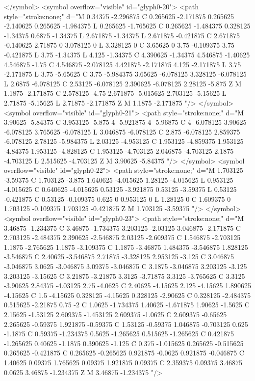 </symbol>
<symbol overflow="visible" id="glyph0-20">
<path style="stroke:none;" d="M 0.34375 -2.296875 C 0.265625 -2.171875 0.265625 -2.140625 0.265625 -1.984375 L 0.265625 -1.765625 C 0.265625 -1.484375 0.328125 -1.34375 0.6875 -1.34375 L 2.671875 -1.34375 L 2.671875 -0.421875 C 2.671875 -0.140625 2.71875 0 3.078125 0 L 3.328125 0 C 3.65625 0 3.75 -0.109375 3.75 -0.421875 L 3.75 -1.34375 L 4.125 -1.34375 C 4.390625 -1.34375 4.546875 -1.40625 4.546875 -1.75 C 4.546875 -2.078125 4.421875 -2.171875 4.125 -2.171875 L 3.75 -2.171875 L 3.75 -5.65625 C 3.75 -5.984375 3.65625 -6.078125 3.328125 -6.078125 L 2.6875 -6.078125 C 2.53125 -6.078125 2.390625 -6.078125 2.28125 -5.875 Z M 1.1875 -2.171875 C 2.578125 -4.75 2.671875 -5.015625 2.703125 -5.15625 L 2.71875 -5.15625 L 2.71875 -2.171875 Z M 1.1875 -2.171875 "/>
</symbol>
<symbol overflow="visible" id="glyph0-21">
<path style="stroke:none;" d="M 3.90625 -5.84375 C 3.953125 -5.875 4 -5.921875 4 -5.96875 C 4 -6.078125 3.90625 -6.078125 3.765625 -6.078125 L 3.046875 -6.078125 C 2.875 -6.078125 2.859375 -6.078125 2.78125 -5.984375 L 2.03125 -4.953125 C 1.953125 -4.859375 1.953125 -4.84375 1.953125 -4.828125 C 1.953125 -4.703125 2.046875 -4.703125 2.1875 -4.703125 L 2.515625 -4.703125 Z M 3.90625 -5.84375 "/>
</symbol>
<symbol overflow="visible" id="glyph0-22">
<path style="stroke:none;" d="M 1.703125 -3.59375 C 1.703125 -3.875 1.640625 -4.015625 1.28125 -4.015625 L 0.953125 -4.015625 C 0.640625 -4.015625 0.53125 -3.921875 0.53125 -3.59375 L 0.53125 -0.421875 C 0.53125 -0.109375 0.625 0 0.953125 0 L 1.28125 0 C 1.609375 0 1.703125 -0.109375 1.703125 -0.421875 Z M 1.703125 -3.59375 "/>
</symbol>
<symbol overflow="visible" id="glyph0-23">
<path style="stroke:none;" d="M 3.46875 -1.234375 C 3.46875 -1.734375 3.203125 -2.03125 3.046875 -2.171875 C 2.703125 -2.484375 2.390625 -2.546875 2.03125 -2.609375 C 1.546875 -2.703125 1.1875 -2.765625 1.1875 -3.109375 C 1.1875 -3.46875 1.484375 -3.546875 1.828125 -3.546875 C 2.40625 -3.546875 2.71875 -3.328125 2.953125 -3.125 C 3.046875 -3.046875 3.0625 -3.046875 3.09375 -3.046875 C 3.1875 -3.046875 3.203125 -3.125 3.203125 -3.15625 C 3.21875 -3.21875 3.3125 -3.71875 3.3125 -3.765625 C 3.3125 -3.90625 2.84375 -4.03125 2.75 -4.0625 C 2.40625 -4.15625 2.125 -4.15625 1.890625 -4.15625 C 1.5 -4.15625 0.328125 -4.15625 0.328125 -2.90625 C 0.328125 -2.484375 0.515625 -2.21875 0.75 -2 C 1.0625 -1.734375 1.40625 -1.671875 1.90625 -1.5625 C 2.15625 -1.53125 2.609375 -1.453125 2.609375 -1.0625 C 2.609375 -0.65625 2.265625 -0.59375 1.921875 -0.59375 C 1.53125 -0.59375 1.046875 -0.703125 0.625 -1.1875 C 0.59375 -1.234375 0.5625 -1.265625 0.515625 -1.265625 C 0.421875 -1.265625 0.40625 -1.1875 0.390625 -1.125 C 0.375 -1.015625 0.265625 -0.515625 0.265625 -0.421875 C 0.265625 -0.265625 0.921875 -0.0625 0.921875 -0.046875 C 1.40625 0.09375 1.765625 0.09375 1.921875 0.09375 C 2.359375 0.09375 3.46875 0.0625 3.46875 -1.234375 Z M 3.46875 -1.234375 "/>
